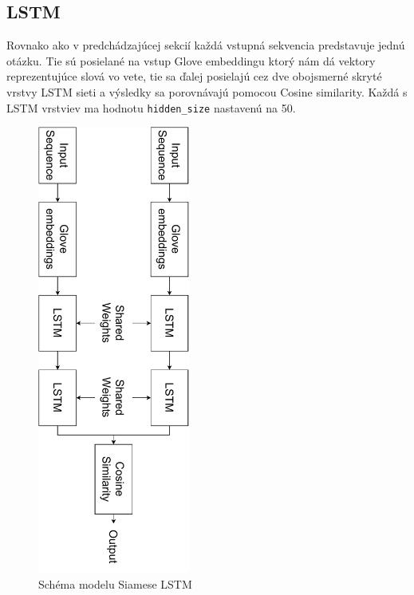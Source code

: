 \documentclass[a4paper, 16pt]{article}
\begin{document}
\subsection{LSTM}
\label{LSTM_a}
Rovnako ako v predchádzajúcej sekcií každá vstupná sekvencia predstavuje jednú otázku. Tie sú posielané na vstup Glove embeddingu ktorý nám dá vektory reprezentujúce slová vo vete, tie sa ďalej posielajú cez dve obojsmerné skryté vrstvy LSTM sieti a výsledky sa porovnávajú pomocou Cosine similarity. Každá s LSTM vrstviev ma hodnotu \texttt{hidden\_size} nastavenú na 50.
\begin{figure}[H]
    \centering
    \includegraphics[width=5cm, angle =90 ]{imgs/LSTM.pdf}
    \caption{Schéma modelu Siamese LSTM}
    \label{fig:4}
\end{figure}
\end{document}
